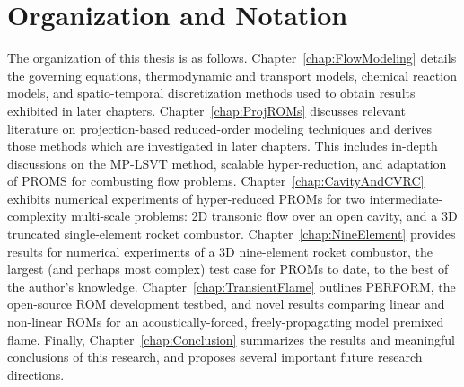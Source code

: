\section{Organization and Notation}

The organization of this thesis is as follows. Chapter~\ref{chap:FlowModeling} details the governing equations, thermodynamic and transport models, chemical reaction models, and spatio-temporal discretization methods used to obtain results exhibited in later chapters. Chapter~\ref{chap:ProjROMs} discusses relevant literature on projection-based reduced-order modeling techniques and derives those methods which are investigated in later chapters. This includes in-depth discussions on the MP-LSVT method, scalable hyper-reduction, and adaptation of PROMS for combusting flow problems. Chapter~\ref{chap:CavityAndCVRC} exhibits numerical experiments of hyper-reduced PROMs for two intermediate-complexity multi-scale problems: 2D transonic flow over an open cavity, and a 3D truncated single-element rocket combustor. Chapter~\ref{chap:NineElement} provides results for numerical experiments of a 3D nine-element rocket combustor, the largest (and perhaps most complex) test case for PROMs to date, to the best of the author's knowledge. {\color{red}Chapter~\ref{chap:TransientFlame} outlines PERFORM, the open-source ROM development testbed, and novel results comparing linear and non-linear ROMs for an acoustically-forced, freely-propagating model premixed flame.} Finally, Chapter~\ref{chap:Conclusion} summarizes the results and meaningful conclusions of this research, and proposes several important future research directions.

